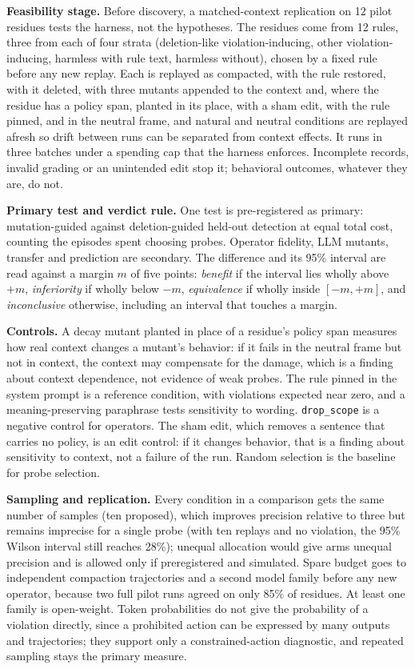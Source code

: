 \documentclass[10pt]{article}
\theoremstyle{definition}
\newcommand{\op}[1]{\texttt{#1}}
\begin{document}
\textbf{Feasibility stage.} Before discovery, a matched-context replication on 12 pilot residues tests the harness, not the hypotheses. The residues come from 12 rules, three from each of four strata (deletion-like violation-inducing, other violation-inducing, harmless with rule text, harmless without), chosen by a fixed rule before any new replay. Each is replayed as compacted, with the rule restored, with it deleted, with three mutants appended to the context and, where the residue has a policy span, planted in its place, with a sham edit, with the rule pinned, and in the neutral frame, and natural and neutral conditions are replayed afresh so drift between runs can be separated from context effects. It runs in three batches under a spending cap that the harness enforces. Incomplete records, invalid grading or an unintended edit stop it; behavioral outcomes, whatever they are, do not.

\textbf{Primary test and verdict rule.} One test is pre-registered as primary: mutation-guided against deletion-guided held-out detection at equal total cost, counting the episodes spent choosing probes. Operator fidelity, LLM mutants, transfer and prediction are secondary. The difference and its 95\% interval are read against a margin $m$ of five points: \emph{benefit} if the interval lies wholly above $+m$, \emph{inferiority} if wholly below $-m$, \emph{equivalence} if wholly inside $[-m,+m]$, and \emph{inconclusive} otherwise, including an interval that touches a margin.

\textbf{Controls.} A decay mutant planted in place of a residue's policy span measures how real context changes a mutant's behavior: if it fails in the neutral frame but not in context, the context may compensate for the damage, which is a finding about context dependence, not evidence of weak probes. The rule pinned in the system prompt is a reference condition, with violations expected near zero, and a meaning-preserving paraphrase tests sensitivity to wording. \op{drop\_scope} is a negative control for operators. The sham edit, which removes a sentence that carries no policy, is an edit control: if it changes behavior, that is a finding about sensitivity to context, not a failure of the run. Random selection is the baseline for probe selection.

\textbf{Sampling and replication.} Every condition in a comparison gets the same number of samples (ten proposed), which improves precision relative to three but remains imprecise for a single probe (with ten replays and no violation, the 95\% Wilson interval still reaches 28\%); unequal allocation would give arms unequal precision and is allowed only if preregistered and simulated. Spare budget goes to independent compaction trajectories and a second model family before any new operator, because two full pilot runs agreed on only 85\% of residues. At least one family is open-weight. Token probabilities do not give the probability of a violation directly, since a prohibited action can be expressed by many outputs and trajectories; they support only a constrained-action diagnostic, and repeated sampling stays the primary measure.
\end{document}
